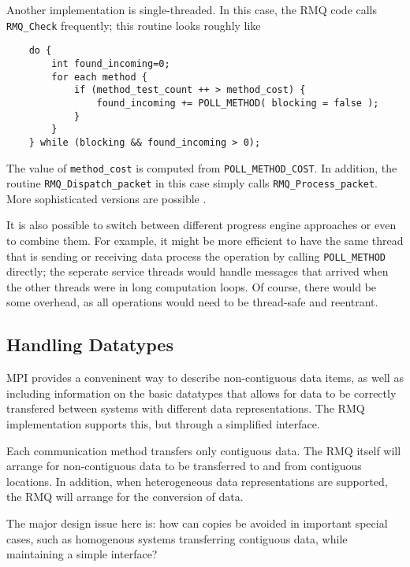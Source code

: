 \documentclass{article}
\let\code=\texttt
\begin{document}
Another implementation is single-threaded.  In this case, the RMQ code
calls \code{RMQ\_Check} frequently; this routine looks roughly like
\begin{verbatim}
    do { 
        int found_incoming=0;
        for each method {
            if (method_test_count ++ > method_cost) {
                found_incoming += POLL_METHOD( blocking = false );
            }
        }
    } while (blocking && found_incoming > 0);
\end{verbatim}
The value of \code{method\_cost} is computed from \code{POLL\_METHOD\_COST}.
In addition, the routine \code{RMQ\_Dispatch\_packet} in this case simply calls
\code{RMQ\_Process\_packet}.  More sophisticated versions are possible
\cite{isca92*256}. 

It is also possible to switch between different progress engine approaches or
even to combine them.  For example, it might be more efficient to have the
same thread that is sending or receiving data process the operation by calling
\code{POLL\_METHOD} directly; the seperate service threads would handle
messages that arrived when the other threads were in long computation loops.
Of course, there would be some overhead, as all operations would need to be
thread-safe and reentrant.

\subsection{Handling Datatypes}
\label{sec:rmq-datatypes}
MPI provides a conveninent way to describe non-contiguous data items, as well
as including information on the basic datatypes that allows for data to be
correctly transfered between systems with different data representations.  The
RMQ implementation supports this, but through a simplified interface.

Each communication method transfers only contiguous data.  The RMQ itself will
arrange for non-contiguous data to be transferred to and from contiguous
locations.  In addition, when heterogeneous data representations are
supported, the RMQ will arrange for the conversion of data.  

The major design issue here is: how can copies be avoided in important special
cases, such as homogenous systems transferring contiguous data, while
maintaining a simple interface?
\end{document}

